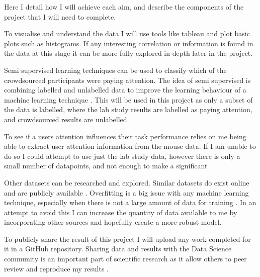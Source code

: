 \documentclass{article}
\begin{document}
Here I detail how I will achieve each aim, and describe the components of the project that I will need to complete.

To visualise and understand the data I will use tools like tableau and plot basic plots such as histograms.
If any interesting correlation or information is found in the data at this stage it can be more fully explored in depth later in the project.


Semi supervised learning techniques can be used to classify which of the crowdsourced participants were paying attention.
The idea of semi supervised is combining labelled and unlabelled data to improve the learning behaviour of a machine learning technique \cite{zhu2009introduction}.
This will be used in this project as only a subset of the data is labelled, where the lab study results are labelled as paying attention, and crowdsourced results are unlabelled.

To see if a users attention influences their task performance relies on me being able to extract user attention information from the mouse data.
If I am unable to do so I could attempt to use just the lab study data, however there is only a small number of datapoints, and not enough to make a significant


Other datasets can be researched and explored.
Similar datasets do exist online and are publicly available \cite{kaggleWorkerActivity}.
Overfitting is a big issue with any machine learning technique, especially when there is not a large amount of data for training \cite{dietterich1995overfitting}.
In an attempt to avoid this I can increase the quantity of data available to me by incorporating other sources and hopefully create a more robust model.



To publicly share the result of this project I will upload any work completed for it in a GitHub repository.
Sharing data and results with the Data Science community is an important part of scientific research as it allow others to peer review and reproduce my results \cite{Birnholtz2003data}.
\end{document}
